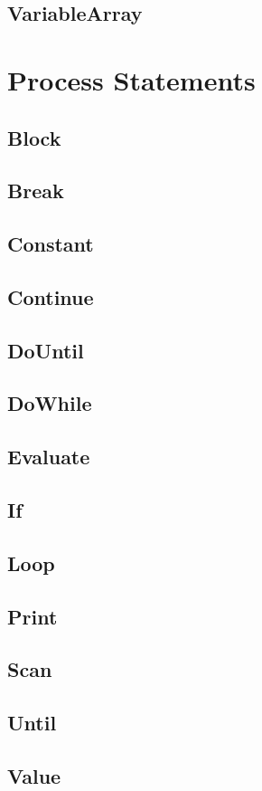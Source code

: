 \subsection{VariableArray}
\section{Process Statements}
\subsection{Block}
\subsection{Break}
\subsection{Constant}
\subsection{Continue}
\subsection{DoUntil}
\subsection{DoWhile}
\subsection{Evaluate}
\subsection{If}
\subsection{Loop}
\subsection{Print}
\subsection{Scan}
\subsection{Until}
\subsection{Value}
